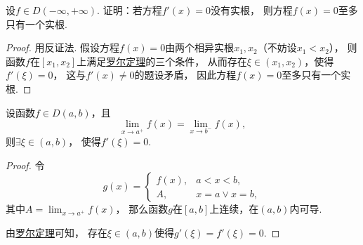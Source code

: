 \begin{example}
设\(f \in D(-\infty,+\infty)\).
证明：若方程\(f'(x) = 0\)没有实根，
则方程\(f(x) = 0\)至多只有一个实根.
\begin{proof}
用反证法.
假设方程\(f(x) = 0\)由两个相异实根\(x_1,x_2\)（不妨设\(x_1 < x_2\)），
则函数\(f\)在\([x_1,x_2]\)上满足\hyperref[theorem:微分中值定理.罗尔定理]{罗尔定理}的三个条件，
从而存在\(\xi\in(x_1,x_2)\)，使得\(f'(\xi) = 0\)，
这与\(f'(x) \neq 0\)的题设矛盾，
因此方程\(f(x) = 0\)至多只有一个实根.
\end{proof}
\end{example}

\begin{corollary}
设函数\(f \in D(a,b)\)，且\[
	\lim_{x \to a^+} f(x)
	= \lim_{x \to b^-} f(x),
\]
则\(\exists\xi\in(a,b)\)，
使得\(f'(\xi) = 0\).
\begin{proof}
令\begin{equation*}
	g(x) = \left\{ \begin{array}{cl}
		f(x), & a < x < b, \\
		A, & x = a \lor x = b,
	\end{array} \right.
\end{equation*}
其中\(A = \lim_{x \to a^+} f(x)\)，
那么函数\(g\)在\([a,b]\)上连续，在\((a,b)\)内可导.

由\hyperref[theorem:微分中值定理.罗尔定理]{罗尔定理}可知，
存在\(\xi\in(a,b)\)使得\(g'(\xi) = f'(\xi) = 0\).
\end{proof}
\end{corollary}

